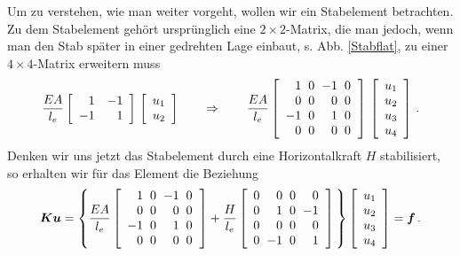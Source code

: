 Um zu verstehen, wie man weiter vorgeht, wollen wir ein Stabelement betrachten. Zu dem Stabelement geh\"{o}rt urspr\"{u}nglich eine $2 \times 2$-Matrix, die man jedoch, wenn man den Stab sp\"{a}ter in einer gedrehten Lage einbaut, s. Abb. \ref{Stabflat}, zu einer $4 \times 4$-Matrix erweitern muss
\begin{align}
\frac{EA}{l_e} \left[ \barr {r r } 1 & -1 \\ -1 & 1 \earr \right] \,\left [\barr {c} u_1 \\
u_2 \earr \right]  \qquad \Rightarrow \qquad \frac{EA}{l_e} \left[ \barr
{r@{\hspace{2mm}}  r@{\hspace{2mm}} r@{\hspace{2mm}} r@{\hspace{2mm}} r}
 1 & 0 & -1 & 0 \\
0 & 0 & 0 & 0 \\ -1 & 0 & 1 & 0 \\ 0 & 0 & 0 & 0 \earr \right] \,\left [\barr {c} u_1 \\
u_2 \\ u_3 \\ u_4 \earr \right]\,.
\end{align}
Denken wir uns jetzt das Stabelement durch eine Horizontalkraft $H$ stabilisiert, so erhalten wir f\"{u}r das Element die Beziehung
\begin{align}
\vek K \vek u = \left\{\frac{EA}{l_e} \left[ \barr {r@{\hspace{2mm}}  r@{\hspace{2mm}}
r@{\hspace{2mm}} r@{\hspace{2mm}} r}
 1 & 0 & -1 & 0 \\
0 & 0 & 0 & 0 \\ -1 & 0 & 1 & 0 \\ 0 & 0 & 0 & 0 \earr \right] + \frac{H}{l_e} \left[
\barr {r@{\hspace{2mm}}  r@{\hspace{2mm}} r@{\hspace{2mm}} r@{\hspace{2mm}} r}
 0 & 0 & 0 & 0 \\
0 & 1 & 0 & -1 \\ 0 & 0 & 0 & 0 \\ 0 & -1 & 0 & 1 \earr \right]
\,\right\}  \left [\barr {c} u_1 \\
u_2 \\ u_3 \\ u_4 \earr \right] = \vek f\,.
\end{align}
